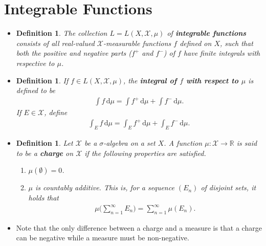 \documentclass[10pt]{article}
\newtheorem{definition}[lemma]{Definition}
\newcommand{\dee}{\mathrm{d}}
\newcommand{\mcal}[1]{\mathcal{#1}}
\newcommand{\Real}{\mathbb{R}}
\begin{document}
\section{Integrable Functions}

\begin{itemize}
  \item \begin{definition}
    The collection $L = L(X,\mcal{X},\mu)$ of {\bf integrable functions} consists of all real-valued $\mcal{X}$-measurable functions $f$ defined on $X$, such that both the positive and negative parts ($f^+$ and $f^-$) of $f$ have finite integrals with respective to $\mu$.
  \end{definition}

  \item \begin{definition}
    If $f \in L(X,\mcal{X},\mu)$, the {\bf integral of $f$ with respect to $\mu$} is defined to be
    \begin{align*}
      \int f \, \dee\mu = \int f^+\, \dee\mu + \int f^-\, \dee\mu.
    \end{align*}
    If $E \in \mcal{X}$, define 
    \begin{align*}
      \int_E f \, \dee\mu = \int_E f^+\, \dee\mu + \int_E f^-\, \dee\mu.
    \end{align*}
  \end{definition}

  \item \begin{definition}
    Let $\mcal{X}$ be a $\sigma$-algebra on a set $X$. A function $\mu: \mcal{X} \rightarrow 
    \Real$ is said to be a {\bf charge} on $\mcal{X}$ if the following properties are satisfied.
    \begin{enumerate}
      \item $\mu(\emptyset) = 0$.
      \item $\mu$ is countably additive. This is, for a sequence $(E_n)$ of disjoint sets, it holds that
      \begin{align*}
        \mu\bigg( \sum_{n=1}^\infty E_n \bigg) = \sum_{n=1}^\infty \mu(E_n).
      \end{align*}
    \end{enumerate}
  \end{definition}

  \item Note that the only difference between a charge and a measure is that a charge can be negative while a measure must be non-negative.
  

\end{itemize}
\end{document}
